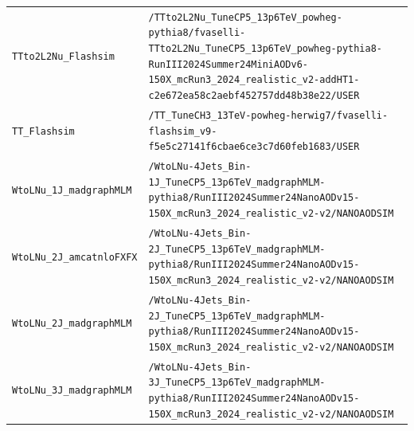 \begin{longtable}{@{}>{\RaggedRight\arraybackslash}p{} >{\RaggedRight\arraybackslash}p{}@{}}
\addlinespace[2pt]
\texttt{TTto2L2Nu\_\allowbreak{}Flashsim} & \texttt{/\allowbreak{}TTto2L2Nu\_\allowbreak{}TuneCP5\_\allowbreak{}13p6TeV\_\allowbreak{}powheg-\allowbreak{}pythia8/\allowbreak{}fvaselli-\allowbreak{}TTto2L2Nu\_\allowbreak{}TuneCP5\_\allowbreak{}13p6TeV\_\allowbreak{}powheg-\allowbreak{}pythia8-\allowbreak{}RunIII2024Summer24MiniAODv6-\allowbreak{}150X\_\allowbreak{}mcRun3\_\allowbreak{}2024\_\allowbreak{}realistic\_\allowbreak{}v2-\allowbreak{}addHT1-\allowbreak{}c2e672ea58c2aebf452757dd48b38e22/\allowbreak{}USER} \\
\addlinespace[2pt]
\texttt{TT\_\allowbreak{}Flashsim} & \texttt{/\allowbreak{}TT\_\allowbreak{}TuneCH3\_\allowbreak{}13TeV-\allowbreak{}powheg-\allowbreak{}herwig7/\allowbreak{}fvaselli-\allowbreak{}flashsim\_\allowbreak{}v9-\allowbreak{}f5e5c27141f6cbae6ce3c7d60feb1683/\allowbreak{}USER} \\
\addlinespace[2pt]
\texttt{WtoLNu\_\allowbreak{}1J\_\allowbreak{}madgraphMLM} & \texttt{/\allowbreak{}WtoLNu-\allowbreak{}4Jets\_\allowbreak{}Bin-\allowbreak{}1J\_\allowbreak{}TuneCP5\_\allowbreak{}13p6TeV\_\allowbreak{}madgraphMLM-\allowbreak{}pythia8/\allowbreak{}RunIII2024Summer24NanoAODv15-\allowbreak{}150X\_\allowbreak{}mcRun3\_\allowbreak{}2024\_\allowbreak{}realistic\_\allowbreak{}v2-\allowbreak{}v2/\allowbreak{}NANOAODSIM} \\
\addlinespace[2pt]
\texttt{WtoLNu\_\allowbreak{}2J\_\allowbreak{}amcatnloFXFX} & \texttt{/\allowbreak{}WtoLNu-\allowbreak{}4Jets\_\allowbreak{}Bin-\allowbreak{}2J\_\allowbreak{}TuneCP5\_\allowbreak{}13p6TeV\_\allowbreak{}madgraphMLM-\allowbreak{}pythia8/\allowbreak{}RunIII2024Summer24NanoAODv15-\allowbreak{}150X\_\allowbreak{}mcRun3\_\allowbreak{}2024\_\allowbreak{}realistic\_\allowbreak{}v2-\allowbreak{}v2/\allowbreak{}NANOAODSIM} \\
\addlinespace[2pt]
\texttt{WtoLNu\_\allowbreak{}2J\_\allowbreak{}madgraphMLM} & \texttt{/\allowbreak{}WtoLNu-\allowbreak{}4Jets\_\allowbreak{}Bin-\allowbreak{}2J\_\allowbreak{}TuneCP5\_\allowbreak{}13p6TeV\_\allowbreak{}madgraphMLM-\allowbreak{}pythia8/\allowbreak{}RunIII2024Summer24NanoAODv15-\allowbreak{}150X\_\allowbreak{}mcRun3\_\allowbreak{}2024\_\allowbreak{}realistic\_\allowbreak{}v2-\allowbreak{}v2/\allowbreak{}NANOAODSIM} \\
\addlinespace[2pt]
\texttt{WtoLNu\_\allowbreak{}3J\_\allowbreak{}madgraphMLM} & \texttt{/\allowbreak{}WtoLNu-\allowbreak{}4Jets\_\allowbreak{}Bin-\allowbreak{}3J\_\allowbreak{}TuneCP5\_\allowbreak{}13p6TeV\_\allowbreak{}madgraphMLM-\allowbreak{}pythia8/\allowbreak{}RunIII2024Summer24NanoAODv15-\allowbreak{}150X\_\allowbreak{}mcRun3\_\allowbreak{}2024\_\allowbreak{}realistic\_\allowbreak{}v2-\allowbreak{}v2/\allowbreak{}NANOAODSIM} \\

\end{longtable}

